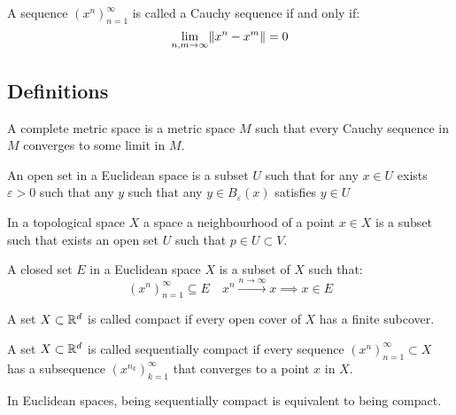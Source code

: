 \documentclass[11pt,a4paper]{article}
\begin{document}
\begin{definition}
A sequence $(x^n)_{n=1}^{\infty}$ is called a Cauchy sequence if and only 
if:
\[
  \lim_{n,m \to \infty}{\norm{x^n - x^m}} = 0
\]
\end{definition}

\subsection{Definitions}
\begin{definition}
A complete metric space is a metric space $M$ such that every
Cauchy sequence in $M$ converges to some limit in $M$.
\end{definition}

\begin{definition}
An open set in a Euclidean space is a subset $U$ such that
for any $x \in U$ exists $\varepsilon > 0$ such that any $y$ such that
any $y \in B_\varepsilon(x)$ satisfies $y \in U$
\end{definition}

\begin{definition}[Neighbourhood]
In a topological space $X$ a space a neighbourhood of a point $x\in X$
is a subset such that exists an open set $U$ such that $p\in U\subset V$.
\end{definition}

\begin{definition}
A closed set $E$ in a Euclidean space $X$ is a subset of $X$ such that:
\[
  (x^n)_{n=1}^{\infty}\subseteq E \quad x^n \xrightarrow{n\to\infty} x
  \implies x \in E
\]
\end{definition}

\begin{definition}
A set $X \subset \mathbb{R}^d$ is called compact if every open cover of $X$ has a 
finite subcover.
\end{definition}

\begin{definition}
  A set $X \subset \mathbb{R}^d$ is called sequentially compact if
  every sequence $(x^n)_{n=1}^{\infty} \subset X$ has a subsequence 
  $(x^{n_k})_{k=1}^{\infty}$ that converges to a point $x$ in $X$.
\end{definition}

\begin{remark}
  In Euclidean spaces, being sequentially compact is equivalent to being
  compact.
\end{remark}
\end{document}
